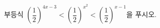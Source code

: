 부등식 $\left(\dfrac{1}{2}\right)^{4x-3}<\left(\dfrac{1}{2}\right)^{x^{2}}<\left(\dfrac{1}{2}\right)^{x-1}$을 푸시오.
